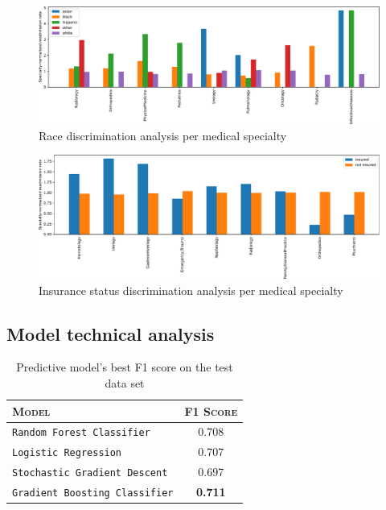 \documentclass[a4paper,11pt]{article}
\begin{document}
\begin{figure}[!htb]
	\centering
	\includegraphics[width=1\textwidth]{images/descrimination_histogram_race.pdf}
	\caption{Race discrimination analysis per medical specialty}
	\label{fig:discrimination_histogram_race}
\end{figure}

\begin{figure}[!htb]
	\centering
	\includegraphics[width=1\textwidth]{images/descrimination_histogram_is_insured.pdf}
	\caption{Insurance status discrimination analysis per medical specialty}
	\label{fig:discrimination_histogram_is_insured}
\end{figure}

\newpage
\subsection{Model technical analysis}
\label{sec:model_technical_analysis}


\begin{table}[htb]
\centering
\caption{Predictive model's best F1 score on the test data set}
\label{tab:models_f1_score}
\begin{tabularx}{0.6\textwidth}{Yc}
\toprule
\textsc{Model} & \textsc{F1 Score} \\
\midrule
\texttt{Random Forest Classifier}               & 0.708 \\
\texttt{Logistic Regression}                    & 0.707 \\
\texttt{Stochastic Gradient Descent}            & 0.697 \\
\texttt{Gradient Boosting Classifier}           & \textbf{0.711} \\
\bottomrule
\end{tabularx}
\end{table}
\end{document}
